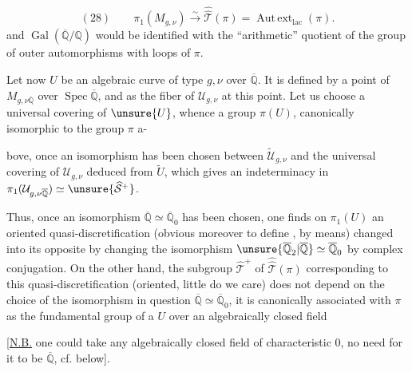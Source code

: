 \[
(28)\qquad \pi_1(M_{g,\nu})\xrightarrow{\sim}\widehat{\widehat{\mathcal T}}(\pi)
=\operatorname{Aut\,ext}_{\mathrm{lac}}(\pi).
\]
and $\operatorname{Gal}(\overline{\mathbb Q}/\mathbb Q)$ would be identified with the ``arithmetic'' quotient of the group of outer automorphisms with loops of $\pi$.

Let now $U$ be an algebraic curve of type $g,\nu$ over $\overline{\mathbb Q}$. It is defined by a point of $M_{g,\nu\overline{\mathbb Q}}$ over $\operatorname{Spec}\overline{\mathbb Q}$, and  as the fiber of $\mathcal U_{g,\nu}$ at this point. Let us choose a universal covering of $\unsure{U}$, whence a group $\pi(U)$, canonically isomorphic to the group $\pi$ a-


bove, once an isomorphism has been chosen between $\widetilde{\mathcal U}_{g,\nu}$ and the universal covering of $\mathcal U_{g,\nu}$ deduced from $\widetilde U$, which gives an indeterminacy in $\pi_1(\mathcal U_{g,\nu\overline{\mathbb Q}})\simeq\unsure{\widehat{\mathcal S}^{+}}$.

Thus, once an isomorphism $\overline{\mathbb Q}\simeq\overline{\mathbb Q}_0$ has been chosen, one finds on $\pi_1(U)$ an oriented quasi-discretification (obvious moreover to define , by  means) changed into its opposite by changing the isomorphism $\unsure{\overline{\mathbb Q}_2|\overline{\mathbb Q}}\simeq\overline{\mathbb Q}_0$ by complex conjugation. On the other hand, the subgroup $\widehat{\mathcal T}^{+}$ of $\widehat{\widehat{\mathcal T}}(\pi)$ corresponding to this quasi-discretification (oriented, little do we care) does not depend on the choice of the isomorphism in question $\overline{\mathbb Q}\simeq\overline{\mathbb Q}_0$, it is canonically associated with $\pi$ as the fundamental group of a $U$ over  an algebraically closed field

[\uline{N.B.} one could take any algebraically closed field of characteristic $0$, no need for it to be  $\overline{\mathbb Q}$, cf. below].



